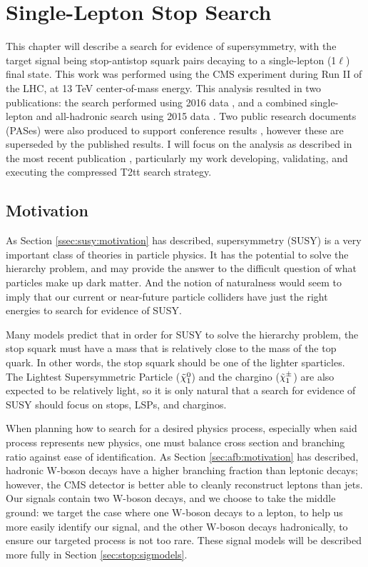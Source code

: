 \chapter{Single-Lepton Stop Search}
\label{chap:stop}

This chapter will describe a search for evidence of supersymmetry, with the target signal
being stop-antistop squark pairs decaying to a single-lepton (1$\ell$)
final state. This work was performed using the CMS experiment during
Run II of the LHC, at 13 TeV center-of-mass energy. This analysis
resulted in two publications: the search performed using 2016 data \cite{stop1l},
and a combined single-lepton and all-hadronic search using 2015 data
\cite{combination0l}. Two public research documents (PASes) were
also produced to support conference results \cite{pasichep,pasmoriond},
however these are superseded by the published results. I will focus on
the analysis as described in the most recent publication
\cite{stop1l}, particularly my work developing, validating, and
executing the compressed T2tt search strategy.

\section{Motivation}
\label{sec:stop:motivation}

As Section \ref{ssec:susy:motivation} has described, supersymmetry
(SUSY) is a very important class of theories in particle physics. It
has the potential to solve the hierarchy problem, and may provide the
answer to the difficult question of what particles make up dark
matter. And the notion of naturalness would seem to imply that our
current or near-future particle colliders have just the right energies
to search for evidence of SUSY.

Many models predict that in order for SUSY to solve the hierarchy
problem, the stop squark must have a mass that is relatively close to %
the mass of the top quark. In other words, the stop squark should be
one of the lighter sparticles. The Lightest Supersymmetric Particle
($\tilde{\chi}^0_1$) and the chargino ($\tilde{\chi}^\pm_1$) are also expected to be
relatively light, so it is only natural that a search for evidence of
SUSY should focus on stops, LSPs, and charginos.

When planning how to search for a desired physics process, especially
when said process represents new physics,
one must balance cross section and branching ratio against
ease of identification. As Section \ref{sec:afb:motivation} has
described, hadronic W-boson decays have a higher branching fraction than
leptonic decays; however, the CMS detector is better able to cleanly
reconstruct leptons than jets. Our signals contain two W-boson decays,
and we choose to take the middle ground: we target the case where one
W-boson decays to a lepton, to help us more easily identify our signal, and
the other W-boson decays hadronically, to
ensure our targeted process is not too rare. These signal models will
be described more fully in Section \ref{sec:stop:sigmodels}.

